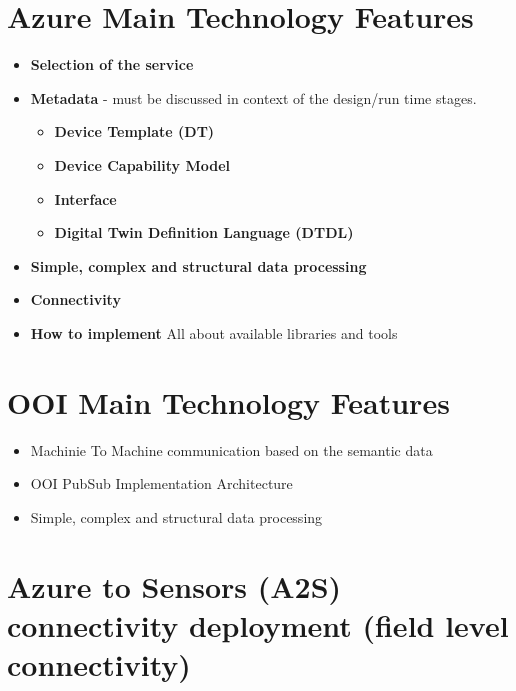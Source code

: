 \documentclass[
]{article}
\providecommand{\tightlist}{%
  \setlength{\itemsep}{0pt}\setlength{\parskip}{0pt}}
\begin{document}
\hypertarget{azure-main-technology-features}{%
\section{Azure Main Technology
Features}\label{azure-main-technology-features}}

\begin{itemize}
\tightlist
\item
  \textbf{Selection of the service}
\item
  \textbf{Metadata} - must be discussed in context of the design/run
  time stages.

  \begin{itemize}
  \tightlist
  \item
    \textbf{Device Template (DT)}
  \item
    \textbf{Device Capability Model}
  \item
    \textbf{Interface}
  \item
    \textbf{Digital Twin Definition Language (DTDL)}
  \end{itemize}
\item
  \textbf{Simple, complex and structural data processing}
\item
  \textbf{Connectivity}
\item
  \textbf{How to implement} All about available libraries and tools
\end{itemize}

\hypertarget{ooi-main-technology-features}{%
\section{OOI Main Technology
Features}\label{ooi-main-technology-features}}

\begin{itemize}
\tightlist
\item
  Machinie To Machine communication based on the semantic data
\item
  OOI PubSub Implementation Architecture
\item
  Simple, complex and structural data processing
\end{itemize}

\hypertarget{azure-to-sensors-a2s-connectivity-deployment-field-level-connectivity}{%
\section{Azure to Sensors (A2S) connectivity deployment (field level
connectivity)}\label{azure-to-sensors-a2s-connectivity-deployment-field-level-connectivity}}
\end{document}

